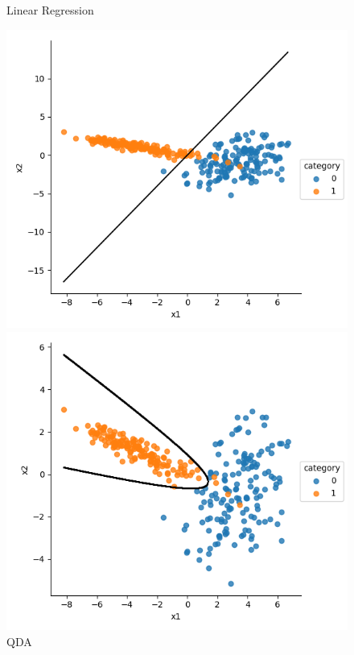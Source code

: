 \documentclass[a4paper]{article}
\begin{document}
\begin{figure}[h]
\begin{minipage}{0,45\textwidth}
\end{minipage}
\begin{minipage}{0,45\textwidth}
\caption{Linear Regression}
\includegraphics[scale=.5]{b_lr.png}
\end{minipage}
\begin{minipage}{0,45\textwidth}
\caption{QDA}
\includegraphics[scale=.5]{b_qda.png}
\end{minipage}
\end{figure}
\end{document}
